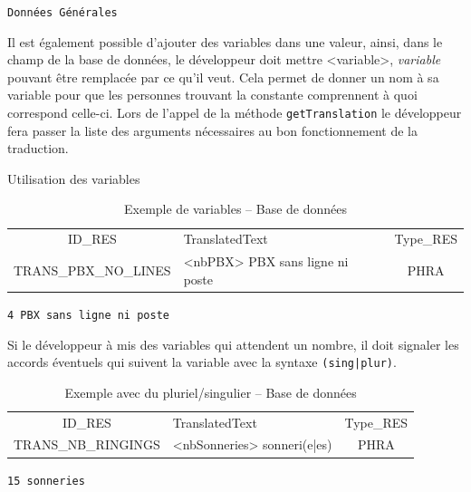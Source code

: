 \begin{description}
\begin{exemple}{}
\begin{table}[H]
				\texttt{Données Générales}
			\end{table}
			\end{exemple}
		\item [Ajouter des variables] Il est également possible d'ajouter des variables dans une valeur, ainsi, dans le champ de la base de données, le développeur doit mettre <variable>, \textit{variable} pouvant être remplacée par ce qu'il veut. Cela
			permet de donner un nom à sa variable pour que les personnes trouvant la constante comprennent à quoi correspond celle-ci. Lors de l'appel de la méthode \texttt{getTranslation} le développeur fera passer la liste des arguments
			nécessaires au bon fonctionnement de la traduction.
			\begin{exemple}{Utilisation des variables}
			\begin{table}[H]
				\centering
				\begin{tabular}{|c|p{5.2cm}|c|}
					\hline
					ID\_RES & TranslatedText & Type\_RES \\
					TRANS\_PBX\_NO\_LINES & <nbPBX> PBX sans ligne ni poste& PHRA\\
					\hline
				\end{tabular}\vspace{10px}
                \caption[Exemple de variables]{Exemple de variables -- Base de données}				

				\texttt{4 PBX sans ligne ni poste}
			\end{table}
			\end{exemple}
\newpage
		\item[Gérer le pluriel ou le singulier]  Si le développeur à mis des variables qui attendent un nombre, il doit signaler les accords éventuels qui suivent la variable avec la syntaxe \texttt{(sing|plur)}.
			\begin{exemple}{}
			\begin{table}[H]
				\centering
				\begin{tabular}{|c|p{5.2cm}|c|}
					\hline
					ID\_RES & TranslatedText & Type\_RES \\
					TRANS\_NB\_RINGINGS& <nbSonneries> sonneri(e|es)& PHRA \\
					\hline
				\end{tabular}\vspace{10px}
                \caption[Exemple avec du pluriel/singulier]{Exemple avec du pluriel/singulier -- Base de données}
				

				\texttt{15 sonneries}
			\end{table}
			\end{exemple}
			\end{description}
